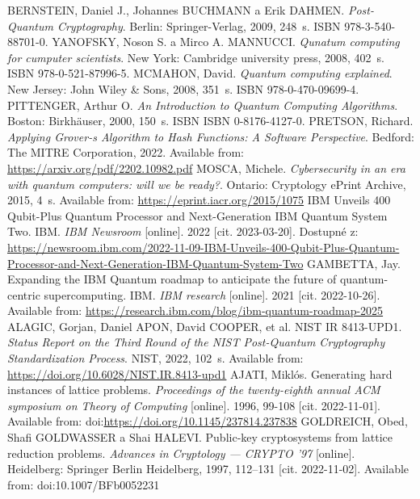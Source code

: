 \begin{thebibliography}{99}
  BERNSTEIN, Daniel J., Johannes BUCHMANN a Erik DAHMEN. \textit{Post-Quantum Cryptography}. Berlin: Springer-Verlag, 2009, 248~s. ISBN 978-3-540-88701-0.
  YANOFSKY, Noson S. a Mirco A. MANNUCCI. \textit{Qunatum computing for cumputer scientists}. New York: Cambridge university press, 2008, 402~s. ISBN 978-0-521-87996-5.
  MCMAHON, David. \textit{Quantum computing explained}. New Jersey: John Wiley \& Sons, 2008, 351~s. ISBN 978-0-470-09699-4.
  PITTENGER, Arthur O. \textit{An Introduction to Quantum Computing Algorithms}. Boston: Birkhäuser, 2000, 150~s. ISBN ISBN 0-8176-4127-0.
  PRETSON, Richard. \textit{Applying Grover-s Algorithm to Hash Functions: A Software Perspective}. Bedford: The MITRE Corporation, 2022. Available from: \url{https://arxiv.org/pdf/2202.10982.pdf}
  MOSCA, Michele. \textit{Cybersecurity in an era with quantum computers: will we be ready?}. Ontario: Cryptology ePrint Archive, 2015, 4~s. Available from: \url{https://eprint.iacr.org/2015/1075}
  IBM Unveils 400 Qubit-Plus Quantum Processor and Next-Generation IBM Quantum System Two. IBM. \textit{IBM Newsroom} [online]. 2022 [cit. 2023-03-20]. Dostupné z: \url{https://newsroom.ibm.com/2022-11-09-IBM-Unveils-400-Qubit-Plus-Quantum-Processor-and-Next-Generation-IBM-Quantum-System-Two}
  GAMBETTA, Jay. Expanding the IBM Quantum roadmap to anticipate the future of quantum-centric supercomputing. IBM. \textit{IBM research} [online]. 2021 [cit. 2022-10-26]. Available from: \url{https://research.ibm.com/blog/ibm-quantum-roadmap-2025}
  ALAGIC, Gorjan, Daniel APON, David COOPER, et al. NIST IR 8413-UPD1. \textit{Status Report on the Third Round of the NIST Post-Quantum Cryptography Standardization Process}. NIST, 2022, 102~s. Available from: \url{https://doi.org/10.6028/NIST.IR.8413-upd1}
  AJATI, Miklós. Generating hard instances of lattice problems. \textit{Proceedings of the twenty-eighth annual ACM symposium on Theory of Computing} [online]. 1996, 99-108 [cit. 2022-11-01]. Available from: doi:\url{https://doi.org/10.1145/237814.237838}
  GOLDREICH, Obed, Shafi GOLDWASSER a Shai HALEVI. Public-key cryptosystems from lattice reduction problems. \textit{Advances in Cryptology --- CRYPTO '97} [online]. Heidelberg: Springer Berlin Heidelberg, 1997, 112--131 [cit. 2022-11-02]. Available from: doi:10.1007/BFb0052231

\end{thebibliography}
